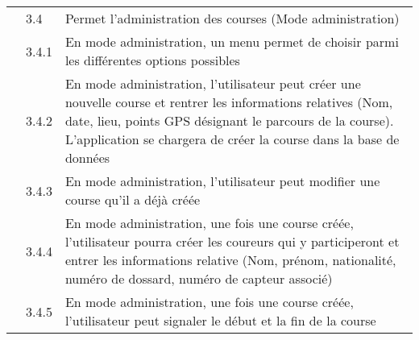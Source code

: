 \begin{longtable}{llp{10cm}}
 & 3.4 & Permet l’administration des courses (Mode administration) \\
 & 3.4.1 & En mode administration, un menu permet de choisir parmi les différentes options possibles \\
 & 3.4.2 & En mode administration, l’utilisateur peut créer une nouvelle course et rentrer les informations relatives (Nom, date, lieu, points GPS désignant le parcours de la course). L’application se chargera de créer la course dans la base de données \\
 & 3.4.3 & En mode administration, l’utilisateur peut modifier une course qu’il a déjà créée \\ 
 & 3.4.4 & En mode administration, une fois une course créée, l’utilisateur pourra créer les coureurs qui y participeront et entrer les informations relative (Nom, prénom, nationalité, numéro de dossard, numéro de capteur associé) \\
 & 3.4.5 & En mode administration, une fois une course créée, l’utilisateur peut signaler le début et la fin de la course \\
\bottomrule
\end{longtable}
